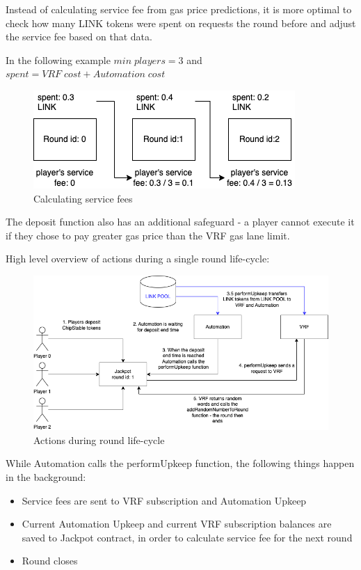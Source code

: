 \documentclass[12pt]{article}
\begin{document}
Instead of calculating service fee from gas price predictions, it is more optimal to check how many LINK tokens were spent on requests the round before and adjust the service fee based on that data.

In the following example \(min\;players = 3\) and \(spent = VRF\;cost + Automation\;cost\)
\begin{figure}[!ht]
    \centering
    \includegraphics[scale=0.8]{images/fees2.png} 
    \caption{Calculating service fees}
    \label{fig:b1}
\end{figure}
\FloatBarrier

The deposit function also has an additional safeguard - a player cannot execute it if they chose to pay greater gas price than the VRF gas lane limit.

\newpage
High level overview of actions during a single round life-cycle:
\begin{figure}[!ht]
    \centering
    \includegraphics[scale=0.6]{images/fees.png} 
    \caption{Actions during round life-cycle}
    \label{fig:b1}
\end{figure}
\FloatBarrier


While Automation calls the performUpkeep function, the following things happen in the background:
\begin{itemize}
    \item Service fees are sent to VRF subscription and Automation Upkeep
    \item Current Automation Upkeep and current VRF subscription balances are saved to Jackpot contract, in order to calculate service fee for the next round
    \item Round closes
\end{itemize}
\end{document}
